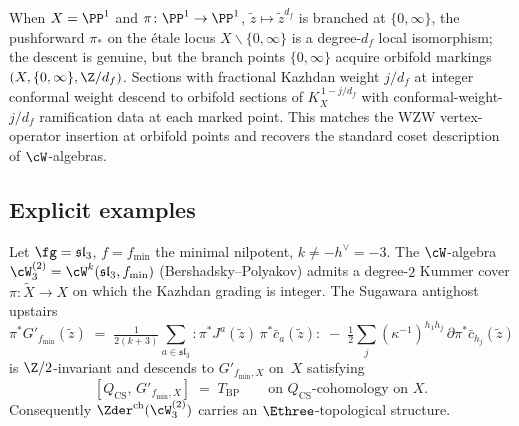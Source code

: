 \begin{remark}
\label{rem:orbifold-descent}
When $X = \PP^{1}$ and $\pi\colon \PP^{1} \to \PP^{1}$, $\tilde z
\mapsto \tilde z^{d_{f}}$ is branched at $\{0, \infty\}$, the
pushforward $\pi_{*}$ on the \'etale locus $X \smallsetminus \{0,
\infty\}$ is a degree-$d_{f}$ local isomorphism; the descent is
genuine, but the branch points $\{0, \infty\}$ acquire orbifold
markings $(X, \{0, \infty\}, \Z/d_{f})$. Sections with fractional
Kazhdan weight $j/d_{f}$ at integer conformal weight descend to
orbifold sections of $K_{X}^{\,1-j/d_{f}}$ with conformal-weight-
$j/d_{f}$ ramification data at each marked point. This matches the
WZW vertex-operator insertion at orbifold points and recovers the
standard coset description of $\cW$-algebras.
\end{remark}

\subsection{Explicit examples}
\label{subsec:fractional-ghost-explicit-examples}

\begin{theorem}
\label{thm:E3-topological-DS-general-explicit-BP}
Let $\fg = \mathfrak{sl}_{3}$, $f = f_{\min}$ the minimal nilpotent,
$k \ne -h^{\vee} = -3$. The $\cW$-algebra $\cW_{3}^{(2)} =
\cW^{k}(\mathfrak{sl}_{3}, f_{\min})$ \textup{(}Bershadsky--Polyakov\textup{)}
admits a degree-$2$ Kummer cover
$\pi\colon \widetilde X \to X$ on which the Kazhdan grading is
integer. The Sugawara antighost upstairs
\[
\pi^{*}G'_{f_{\min}}(\tilde z)
\;=\; \tfrac{1}{2(k+3)} \sum_{a \in \mathfrak{sl}_{3}}
 {:}\pi^{*}J^{a}(\tilde z)\, \pi^{*}\bar c_{a}(\tilde z){:}
\;-\; \tfrac{1}{2}\sum_{j}(\kappa^{-1})^{h_{1}h_{j}}\,
 \partial\pi^{*}\bar c_{h_{j}}(\tilde z)
\]
is $\Z/2$-invariant and descends to $G'_{f_{\min}, X}$ on~$X$
satisfying
\[
[Q_{\mathrm{CS}},\, G'_{f_{\min}, X}] \;=\; T_{\mathrm{BP}}
 \qquad \text{on $Q_{\mathrm{CS}}$-cohomology on~$X$.}
\]
Consequently $\Zder^{\mathrm{ch}}(\cW_{3}^{(2)})$ carries an
$\Ethree$-topological structure.
\end{theorem}

